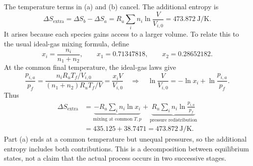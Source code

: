 The temperature terms in (a) and (b) cancel. The additional entropy is
\[
\boxed{\Delta S_{\mathrm{extra}}=\Delta S_b-\Delta S_a
=R_u\sum_i n_i\ln\frac{V}{V_{i,0}}
=473.872~\mathrm{J/K}.}
\]
It arises because each species gains access to a larger volume.
To relate this to the usual ideal-gas mixing formula, define
\[
x_i=\frac{n_i}{n_1+n_2},\qquad x_1=0.71347818,\qquad x_2=0.28652182.
\]
At the common final temperature, the ideal-gas laws give
\[
\frac{p_{i,a}}{p_f}
=\frac{n_iR_uT_f/V_{i,0}}{(n_1+n_2)R_uT_f/V}
=\frac{x_iV}{V_{i,0}}
\quad\Longrightarrow\quad
\ln\frac{V}{V_{i,0}}=-\ln x_i+\ln\frac{p_{i,a}}{p_f}.
\]
Thus
\begin{align*}
\Delta S_{\mathrm{extra}}
&=\underbrace{-R_u\sum_i n_i\ln x_i}_{\text{mixing at common }T,p}
+\underbrace{R_u\sum_i n_i\ln\frac{p_{i,a}}{p_f}}_{\text{pressure redistribution}}\\
&=435.125+38.7471=\boxed{473.872~\mathrm{J/K}}.
\end{align*}
Part (a) ends at a common temperature but unequal pressures, so the additional
entropy includes both contributions. This is a decomposition between equilibrium
states, not a claim that the actual process occurs in two successive stages.
